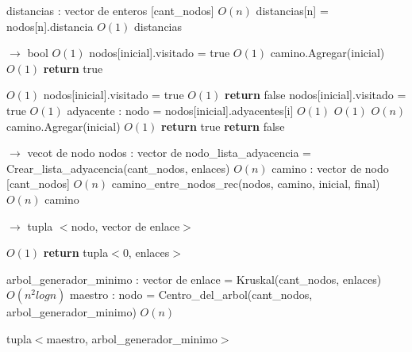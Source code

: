 \documentclass[a4paper, 10pt, twoside]{article}
\newenvironment{pseudo}[1][]{%
    \vspace{0.5em}%
    \begin{algorithmic}%
}
{%
    \end{algorithmic}%
    \vspace{0.5em}%
}
\newcommand{\Ode}[1]{\hfill $O(#1)$}
\begin{document}
\begin{pseudo}
  \State distancias : vector de enteros [cant\_nodos]             \Ode{n}
    \State distancias[n] = nodos[n].distancia               \Ode{1}
  \EndFor
  \Return distancias
\EndProcedure

 $\rightarrow$ bool
                                 \Ode{1}
        \State nodos[inicial].visitado = true                   \Ode{1}
        \State camino.Agregar(inicial)                        \Ode{1}
        \State \textbf{return} true
    \EndIf

                       \Ode{1}
        \State nodos[inicial].visitado = true                   \Ode{1}
        \State \textbf{return} false
    \Else
        \State nodos[inicial].visitado = true                   \Ode{1}
          \State adyacente : nodo = nodos[inicial].adyacentes[i]          \Ode{1}
                                 \Ode{1}
                   \Ode{n}
                    \State camino.Agregar(inicial)                  \Ode{1}
                    \textbf{return} true
                \EndIf
            \EndIf
        \EndFor
        \State \textbf{return} false
    \EndIf
\EndProcedure

 $\rightarrow$ vecot de nodo
    \State nodos : vector de nodo\_lista\_adyacencia = Crear\_lista\_adyacencia(cant\_nodos, enlaces) \Ode{n}
    \State camino : vector de nodo [cant\_nodos]                      \Ode{n}
    \State camino\_entre\_nodos\_rec(nodos, camino, inicial, final)             \Ode{n}
    \Return camino
\EndProcedure


 $\rightarrow$ tupla $<$nodo, vector de enlace$>$

                                 \Ode{1}
    \State \textbf{return} tupla$<$0, enlaces$>$
  \EndIf

  \State arbol\_generador\_minimo : vector de enlace = Kruskal(cant\_nodos, enlaces) \Ode{n^2 log n}
  \State maestro : nodo = Centro\_del\_arbol(cant\_nodos, arbol\_generador\_minimo) \Ode{n}

    \Return tupla$<$maestro, arbol\_generador\_minimo$>$
\EndProcedure
\end{pseudo}
\end{document}
